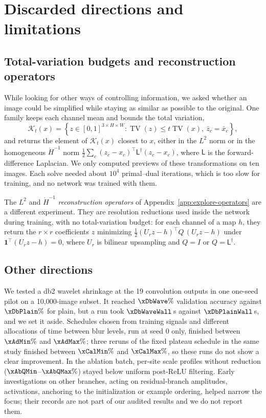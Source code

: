 \section{Discarded directions and limitations}
\label{app:alternatives}
\subsection{Total-variation budgets and reconstruction operators}
While looking for other ways of controlling information, we asked whether an image could be simplified while staying as similar as possible to the original. One family keeps each channel mean and bounds the total variation,
\[
 \mathcal K_t(x)=\left\{z\in[0,1]^{3\times H\times W}:
 \operatorname{TV}(z)\le t\operatorname{TV}(x),\ \bar z_c=\bar x_c\right\},
\]
and returns the element of $\mathcal K_t(x)$ closest to $x$, either in the $L^2$ norm or in the homogeneous $\dot H^{-1}$ norm $\frac12\sum_c(z_c-x_c)^\top\mathsf L^\dagger(z_c-x_c)$, where $\mathsf L$ is the forward-difference Laplacian. We only computed previews of these transformations on ten images. Each solve needed about $10^4$ primal--dual iterations, which is too slow for training, and no network was trained with them.

The $L^2$ and $\dot H^{-1}$ \emph{reconstruction operators} of Appendix~\ref{app:explore-operators} are a different experiment. They are resolution reductions used inside the network during training, with no total-variation budget: for each channel of a map $h$, they return the $r\times r$ coefficients $z$ minimizing $\frac12(U_rz-h)^\top Q\,(U_rz-h)$ under $\mathbf 1^\top(U_rz-h)=0$, where $U_r$ is bilinear upsampling and $Q=I$ or $Q=\mathsf L^\dagger$.

\subsection{Other directions}
We tested a db2 wavelet shrinkage at the 19 convolution outputs in one one-seed pilot on a 10,000-image subset. It reached $\xDbWave\%$ validation accuracy against $\xDbPlain\%$ for plain, but a run took $\xDbWaveWall$\,s against $\xDbPlainWall$\,s, and we set it aside. Schedules chosen from training signals and different allocations of time between blur levels, run at seed 0 only, finished between $\xAdMin\%$ and $\xAdMax\%$; three reruns of the fixed plateau schedule in the same study finished between $\xCalMin\%$ and $\xCalMax\%$, so these runs do not show a clear improvement. In the ablation batch, per-site scale profiles without reduction ($\xAbQMin$--$\xAbQMax\%$) stayed below uniform post-ReLU filtering. Early investigations on other branches, acting on residual-branch amplitudes, activations, anchoring to the initialization or example ordering, helped narrow the focus; their records are not part of our audited results and we do not report them.

